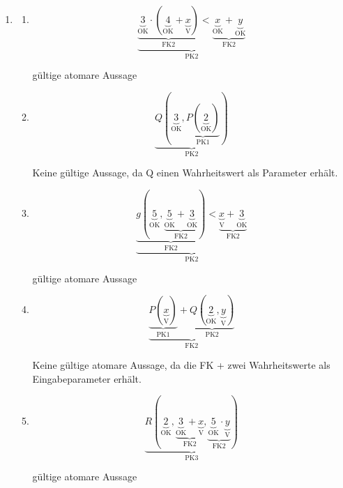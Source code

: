 \documentclass[a4paper]{article}
\begin{document}
	\begin{enumerate}
		\item
		\begin{enumerate}
			\item
			\begin{equation*}
				\underbrace{\underbrace{\underbrace{3}_{\text{OK}} \cdot (\underbrace{4}_{\text{OK}} + \underbrace{x}_{\text{V}})}_{\text{FK2}} < \underbrace{\underbrace{x}_{\text{OK}} + \underbrace{y}_{\text{OK}}}_{\text{FK2}}}_{\text{PK2}}
			\end{equation*}
			\newline
			\begin{center}
				gültige atomare Aussage
			\end{center}
			
			\item
			\begin{equation*}
				\underbrace{Q(\underbrace{3}_{\text{OK}}, \underbrace{P(\underbrace{2}_{\text{OK}})}_{\text{PK1}})}_{\text{PK2}}
			\end{equation*}
			\newline
			\begin{center}
				Keine gültige Aussage, da Q einen Wahrheitswert als Parameter erhält.
			\end{center}
			
			\item
			\begin{equation*}
				\underbrace{\underbrace{g(\underbrace{5}_{\text{OK}}, \underbrace{\underbrace{5}_{\text{OK}} + \underbrace{3}_{\text{OK}}}_{\text{FK2}})}_{\text{FK2}} < \underbrace{\underbrace{x}_{\text{V}} + \underbrace{3}_{\text{OK}}}_{\text{FK2}}}_{\text{PK2}}
			\end{equation*}
			\begin{center}
				gültige atomare Aussage
			\end{center}
			
			\item
			\begin{equation*}
				\underbrace{\underbrace{P(\underbrace{x}_{\text{V}})}_{\text{PK1}} + \underbrace{Q(\underbrace{2}_{\text{OK}}, \underbrace{y}_{\text{V}})}_{\text{PK2}}}_{\text{FK2}}
			\end{equation*}
			\begin{center}
				Keine gültige atomare Aussage, da die FK + zwei Wahrheitswerte als Eingabeparameter erhält.
			\end{center}
			
			\item
			\begin{equation*}
				\underbrace{R(\underbrace{2}_{\text{OK}}, \underbrace{\underbrace{3}_{\text{OK}} + \underbrace{x}_{\text{V}}}_{\text{FK2}}, \underbrace{\underbrace{5}_{\text{OK}} \cdot \underbrace{y}_{\text{V}}}_{\text{FK2}})}_{\text{PK3}}
			\end{equation*}
			\begin{center}
				gültige atomare Aussage
			\end{center}
		\end{enumerate}
		

\end{enumerate}
\end{document}

